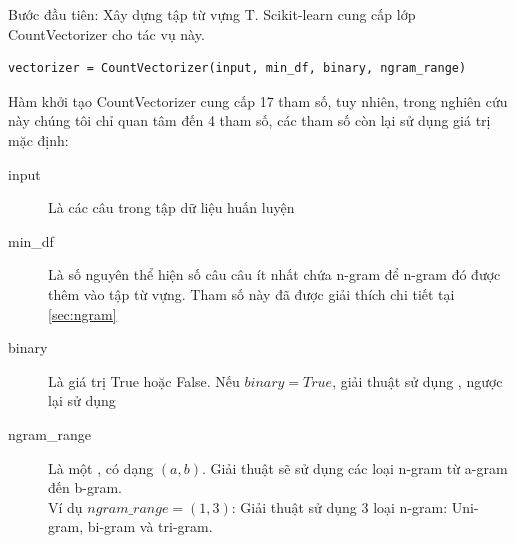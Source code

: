 Bước đầu tiên: Xây dựng tập từ vựng T. Scikit-learn cung cấp lớp CountVectorizer cho tác vụ này.
\begin{lstlisting}
vectorizer = CountVectorizer(input, min_df, binary, ngram_range)
\end{lstlisting}
Hàm khởi tạo CountVectorizer cung cấp 17 tham số, tuy nhiên, trong nghiên cứu này chúng tôi chỉ quan tâm đến 4 tham số, các tham số còn lại sử dụng giá trị mặc định:
\begin{description}
\item[input] Là các câu trong tập dữ liệu huấn luyện
\item[min\_df] Là số nguyên thể hiện số câu câu ít nhất chứa n-gram để n-gram đó được thêm vào tập từ vựng. Tham số này đã được giải thích chi tiết tại \ref{sec:ngram}
\item[binary] Là giá trị True hoặc False. Nếu $binary=True$, giải thuật sử dụng \footnotemark, 
ngược lại sử dụng \footnotemark
 \item[ngram\_range] Là một , có dạng $(a, b)$. Giải thuật sẽ sử dụng các loại n-gram từ a-gram đến b-gram. \\
 Ví dụ $ngram\_range = (1,3)$: Giải thuật sử dụng 3 loại n-gram: Uni-gram, bi-gram và tri-gram.
\end{description}

